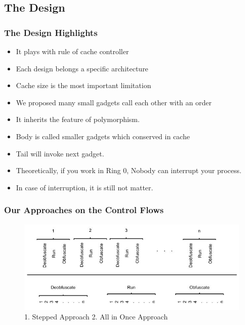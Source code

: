 \documentclass{beamer}
\begin{document}

\subsection{The Design}
\begin{frame}
	\frametitle{The Design Highlights}
	\begin{itemize}
		\item It plays with rule of cache controller
		\item Each design belongs a specific architecture
		\item Cache size is the most important limitation
		\item We proposed many small gadgets call each other with an order
		\item It inherits the feature of polymorphism.
		\item Body is called smaller gadgets which conserved in cache
		\item Tail will invoke next gadget.
		\item Theoretically, if you work in Ring 0, Nobody can interrupt your process.
		\item In case of interruption, it is still not matter.
	\end{itemize}

\end{frame}

\begin{frame}[plain]
	\frametitle{Our Approaches on the Control Flows}
		\begin{figure}
			\includegraphics[width=1\linewidth]{img/control_flow.jpg}
			\caption{1. Stepped Approach 2. All in Once Approach}

		\end{figure}
\end{frame}
\end{document}
